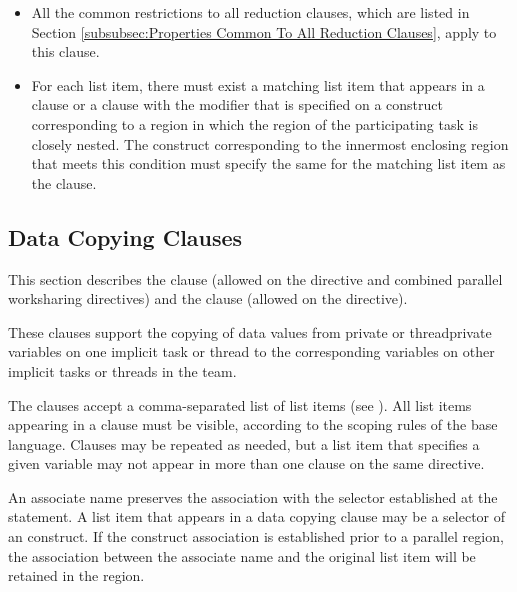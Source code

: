 \begin{itemize}
\item All the common restrictions to all reduction clauses, which are listed in
Section \ref{subsubsec:Properties Common To All Reduction Clauses}, apply to
this clause.

\item For each list item, there must exist a matching list item that appears
    in a  clause or a  clause with the
     modifier that is specified on a construct corresponding to a
    region in which the region of the participating task is closely nested.
    The construct corresponding to the innermost enclosing region that meets
    this condition must specify the same  for the
    matching list item as the  clause.
\end{itemize}










\subsection{Data Copying Clauses}
\label{subsec:Data Copying Clauses}
This section describes the  clause (allowed on the  directive and
combined parallel worksharing directives) and the  clause (allowed on
the  directive).

These clauses support the copying of data values from private or threadprivate variables
on one implicit task or thread to the corresponding variables on other implicit tasks or
threads in the team.

The clauses accept a comma-separated list of list items (see ).
All list items appearing in a clause must be visible, according to the scoping rules of the
base language. Clauses may be repeated as needed, but a list item that specifies a given
variable may not appear in more than one clause on the same directive.

\begin{fortranspecific}
An associate name preserves the association with the selector established at the  statement. A list item that appears in a data copying clause may be a selector of an  construct. If the construct association is established prior to a parallel region, the association between the associate name and the original list item will be retained in the region.
\end{fortranspecific}







